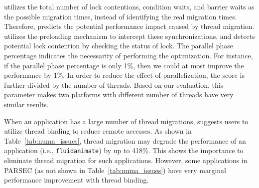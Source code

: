 \NP{} utilizes the total number of lock contentions, condition waits, and barrier waits as the possible migration times, instead of identifying the real migration times. Therefore, \NP{} predicts the potential performance impact caused by thread migration. \NP{} utilizes the preloading mechanism to intercept these synchronizations, and detects potential lock contention by checking the status of lock. The parallel phase percentage indicates the necessarity of performing the optimization. For instance, if the parallel phase percentage is only 1\%, then we could at most improve the performance by 1\%.   In order to reduce the effect of parallelization, the score is further divided by the number of threads. Based on our evaluation, this parameter makes two platforms with different number of threads have very similar results. 

When an application has a large number of thread migrations,  \NP{} suggests users to utilize thread binding to reduce remote accesses. As shown in Table~\ref{tab:numa_issues}, thread migration may degrade the performance of an application (i.e., \texttt{fluidanimate}) by up to 418\%. This shows the importance to eliminate thread migration for such applications.  However, some applications in PARSEC (as not shown in Table~\ref{tab:numa_issues}) have very marginal performance improvement with thread binding. 



